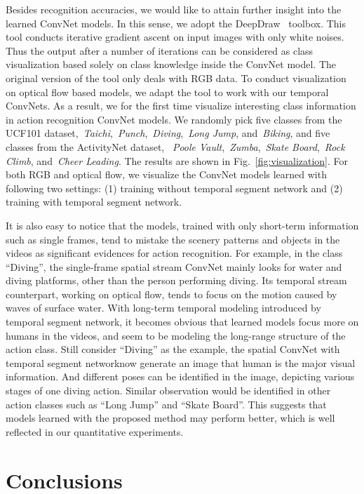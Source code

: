 \documentclass[10pt,journal,compsoc]{IEEEtran}
\newcommand{\SEGNET}{temporal segment network}
\begin{document}
Besides recognition accuracies, we would like to attain further insight into the learned ConvNet models. In this sense, we adopt the DeepDraw~\cite{DeepDraw} toolbox. This tool conducts iterative gradient ascent on input images with only white noises. Thus the output after a number of iterations can be considered as class visualization based solely on class knowledge inside the ConvNet model. The original version of the tool only deals with RGB data. To conduct visualization on optical flow based models, we adapt the tool to work with our temporal ConvNets. As a result, we for the first time visualize interesting class information in action recognition ConvNet models. We randomly pick five classes from the UCF101 dataset,~\emph{Taichi},~\emph{Punch},~\emph{Diving},~\emph{Long Jump}, and~\emph{Biking}, and five classes from the ActivityNet dataset, ~\emph{Poole Vault},~\emph{Zumba},~\emph{Skate Board},~\emph{Rock Climb}, and~\emph{Cheer Leading}. The results are shown in Fig.~\ref{fig:visualization}. For both RGB and optical flow, we visualize the ConvNet models learned with following two settings: (1) training without temporal segment network and (2) training with \SEGNET.


It is also easy to notice that the models, trained with only short-term information such as single frames, tend to mistake the scenery patterns and objects in the videos as significant evidences for action recognition. 
For example, in the class ``Diving'', the single-frame spatial stream ConvNet mainly looks for water and diving platforms, other than the person performing diving. Its temporal stream counterpart, working on optical flow, tends to focus on the motion caused by waves of surface water. 
With long-term temporal modeling introduced by \SEGNET , it becomes obvious that learned models focus more on humans in the videos, and seem to be modeling the long-range structure of the action class. Still consider ``Diving'' as the example, the spatial ConvNet with \SEGNET now generate an image that human is the major visual information. And different poses can be identified in the image, depicting various stages of one diving action. Similar observation would be identified in other action classes such as ``Long Jump'' and ``Skate Board''.
This suggests that models learned with the proposed method may perform better, which is well reflected in our quantitative experiments. 

\section{Conclusions}
\label{sec:con}
\end{document}
